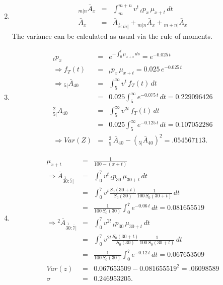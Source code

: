 \documentclass[11pt,fleqn,oneside]{book}
\begin{document}
\begin{enumerate}
\begin{eqnarray*}
\end{eqnarray*}
\item \begin{eqnarray*}
{_{m|n}\bar{A}_x} &=& \int_m^{m+n} v^t\,{_tp_x}\,\mu_{x+t}\,dt\\
{\bar{A}_x} &=& {\bar{A}_{\stackrel{1}{x}:\overline{m}|}}  + {_{m|n}\bar{A}_x} +  {_{m+n|}\bar{A}_x}  
\end{eqnarray*}
The variance can be calculated as usual via the rule of moments.
\item
\begin{eqnarray*}
{_tp_x} &=& e^{-\int_0^t \mu_{x+s}\,ds} = e^{-0.025\,t}\\
\Rightarrow f_{T} (t) &=& {_tp_x}\,\mu_{x+t} = 0.025\,e^{-0.025\,t}\\
\Rightarrow {_{5|}\bar{A}_{40}} &=& \int_5^\infty v^t \, f_T(t)\,dt\\
&=& 0.025 \int_5^\infty e^{-0.075\,t}\,dt = 0.229096426\\
 {^2_{5|}\bar{A}_{40}} &=& \int_5^\infty v^{2t} \, f_T(t)\,dt\\
&=& 0.025 \int_5^\infty e^{-0.125\,t}\,dt = 0.107052286\\
\Rightarrow Var(Z) &=&  {^2_{5|}\bar{A}_{40}} - ({_{5|}\bar{A}_{40}})^2 = .054567113.
\end{eqnarray*}

\item
\begin{eqnarray*}
\mu_{x+t} &=& \frac{1}{100 - (x+t)}\\
\Rightarrow {\bar{A}_{\stackrel{1}{30}:\overline{7}|}} &=& \int_0^7 v^t \, {_tp_{30}}\,\mu_{30+t}\,dt\\
&=& \int_0^7 v^t \frac{S_0(30+t)}{S_0(30)} \frac{1}{100\,S_0(30+t)}\,dt\\
&=& \frac{1}{100\,S_0(30)} \int_0^7 e^{-0.06\,t}\,dt = 0.081655519\\
\Rightarrow {^2\bar{A}_{\stackrel{1}{30}:\overline{7}|}} &=& \int_0^7 v^{2t} \, {_tp_{30}}\,\mu_{30+t}\,dt\\
&=& \int_0^7 v^{2t} \frac{S_0(30+t)}{S_0(30)} \frac{1}{100\,S_0(30+t)}\,dt\\
&=& \frac{1}{100\,S_0(30)} \int_0^7 e^{-0.12\,t}\,dt = 0.067653509\\
Var(z) &=& 0.067653509 - 0.081655519^2 = .06098589\\
\sigma &=& 0.246953205.
\end{eqnarray*}


\end{enumerate}
\end{document}
